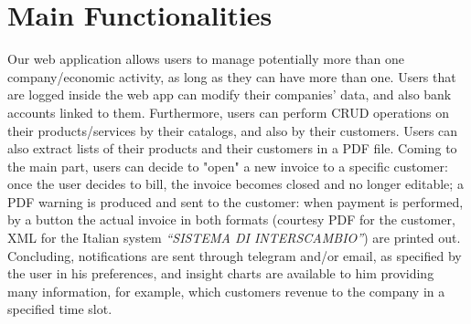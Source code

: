 \section{Main Functionalities}

Our web application allows users to manage potentially more than one company/economic activity, as long as they can have more than one.
Users that are logged inside the web app can modify their companies' data, and also bank accounts linked to them.
Furthermore, users can perform CRUD operations on their products/services by their catalogs, and also by their customers. Users can also
extract lists of their products and their customers in a PDF file.
Coming to the main part, users can decide to "open" a new invoice to a specific customer: once the user decides to bill, the invoice becomes closed
and no longer editable; a PDF warning is produced and sent to the customer: when payment is performed, by a button the actual invoice in both
formats (courtesy PDF for the customer, XML for the Italian system \textit{``SISTEMA DI INTERSCAMBIO''}) are printed out.
Concluding, notifications are sent through telegram and/or email, as specified by the user in his preferences, and insight charts are available to
him providing many information, for example, which customers revenue to the company in a specified time slot.

